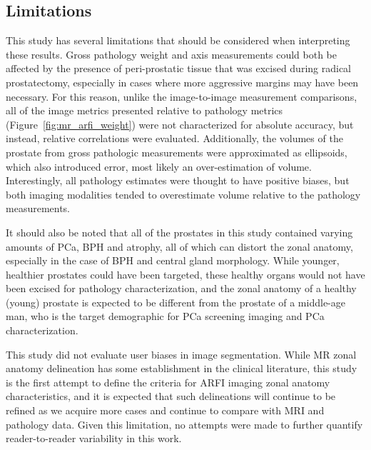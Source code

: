 \subsection{Limitations}
This study has several limitations that should be considered when interpreting
these results.  Gross pathology weight and axis measurements could both be
affected by the presence of peri-prostatic tissue that was excised during
radical prostatectomy, especially in cases where more aggressive margins may
have been necessary.  For this reason, unlike the image-to-image measurement
comparisons, all of the image metrics presented relative to pathology metrics
(Figure~\ref{fig:mr_arfi_weight}) were not characterized for absolute accuracy,
but instead, relative correlations were evaluated.  Additionally, the volumes
of the prostate from gross pathologic measurements were approximated as
ellipsoids, which also introduced error, most likely an over-estimation of
volume.  Interestingly, all pathology estimates were thought to have positive
biases, but both imaging modalities tended to overestimate volume relative to
the pathology measurements.

It should also be noted that all of the prostates in this study contained
varying amounts of PCa, BPH and atrophy, all of which can distort the zonal
anatomy, especially in the case of BPH and central gland morphology.  While
younger, healthier prostates could have been targeted, these healthy organs
would not have been excised for pathology characterization, and the zonal
anatomy of a healthy (young) prostate is expected to be different from the
prostate of a middle-age man, who is the target demographic for PCa screening
imaging and PCa characterization. 

This study did not evaluate user biases in image segmentation.  While MR zonal
anatomy delineation has some establishment in the clinical literature, this
study is the first attempt to define the criteria for ARFI imaging zonal
anatomy characteristics, and it is expected that such delineations will
continue to be refined as we acquire more cases and continue to compare with
MRI and pathology data.  Given this limitation, no attempts were made to
further quantify reader-to-reader variability in this work.
